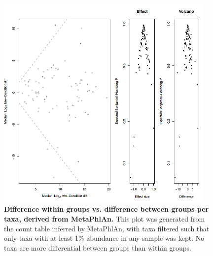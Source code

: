 \begin{figure}[h]
\begin{center}
\includegraphics[width=0.95\textwidth]{metaphlan_aldex.png}
\caption{\textbf{Difference within groups vs. difference between groups per taxa, derived from MetaPhlAn.} This plot was generated from the count table inferred by MetaPhlAn, with taxa filtered such that only taxa with at least 1\% abundance in any sample was kept. No taxa are more differential between groups than within groups.}
\end{center}
\label{nafld_metaphlan_aldex}
\end{figure}

